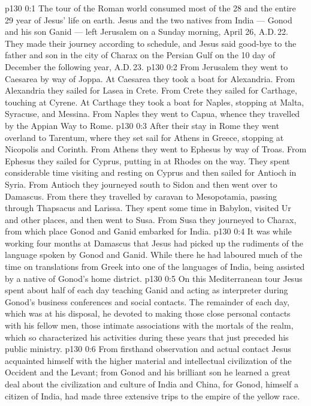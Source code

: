 \author{Midwayer Commission}
\vs p130 0:1 The tour of the Roman world consumed most of the 28 and the entire 29 year of Jesus’ life on earth. Jesus and the two natives from India --- Gonod and his son Ganid --- left Jerusalem on a Sunday morning, April 26, A.D.\,22. They made their journey according to schedule, and Jesus said good\hyp{}bye to the father and son in the city of Charax on the Persian Gulf on the 10 day of December the following year, A.D.\,23.
\vs p130 0:2 \pc From Jerusalem they went to Caesarea by way of Joppa. At Caesarea they took a boat for Alexandria. From Alexandria they sailed for Lasea in Crete. From Crete they sailed for Carthage, touching at Cyrene. At Carthage they took a boat for Naples, stopping at Malta, Syracuse, and Messina. From Naples they went to Capua, whence they travelled by the Appian Way to Rome.
\vs p130 0:3 After their stay in Rome they went overland to Tarentum, where they set sail for Athens in Greece, stopping at Nicopolis and Corinth. From Athens they went to Ephesus by way of Troas. From Ephesus they sailed for Cyprus, putting in at Rhodes on the way. They spent considerable time visiting and resting on Cyprus and then sailed for Antioch in Syria. From Antioch they journeyed south to Sidon and then went over to Damascus. From there they travelled by caravan to Mesopotamia, passing through Thapsacus and Larissa. They spent some time in Babylon, visited Ur and other places, and then went to Susa. From Susa they journeyed to Charax, from which place Gonod and Ganid embarked for India.
\vs p130 0:4 \pc It was while working four months at Damascus that Jesus had picked up the rudiments of the language spoken by Gonod and Ganid. While there he had laboured much of the time on translations from Greek into one of the languages of India, being assisted by a native of Gonod’s home district.
\vs p130 0:5 \pc On this Mediterranean tour Jesus spent about half of each day teaching Ganid and acting as interpreter during Gonod’s business conferences and social contacts. The remainder of each day, which was at his disposal, he devoted to making those close personal contacts with his fellow men, those intimate associations with the mortals of the realm, which so characterized his activities during these years that just preceded his public ministry.
\vs p130 0:6 From firsthand observation and actual contact Jesus acquainted himself with the higher material and intellectual civilization of the Occident and the Levant; from Gonod and his brilliant son he learned a great deal about the civilization and culture of India and China, for Gonod, himself a citizen of India, had made three extensive trips to the empire of the yellow race.

